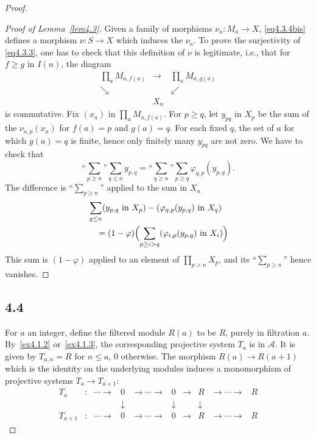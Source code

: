 \documentclass[11pt,a4paper]{article}
\theoremstyle{plain}
\theoremstyle{definition}
\numberwithin{equation}{section}
\begin{document}
\begin{proof}
\begin{proof}[Proof of Lemma~\ref{lem4.3}]
Given a family of morphisms $\nu_{a}: M_{a} \to X$, \eqref{eq4.3.4bis} defines a morphism $\nu: S \to X$ which induces the $\nu_{a}$. To prove the surjectivity of \eqref{eq4.3.3}, one has to check that this definition of $\nu$ is legitimate, i.e., that for $f \geq g$ in $I(n)$, the diagram
\begin{equation*}
\begin{array}{ccc}
\prod_{a} M_{a,f(a)} & \longrightarrow & \prod_{a} M_{a,g(a)} \\[4pt]
\searrow & & \swarrow \\[4pt]
& X_{n}
\end{array}
\end{equation*}
is commutative. Fix $(x_{a})$ in $\prod_{a} M_{a,f(a)}$. For $p \geq q$, let $y_{pq}$ in $X_{p}$ be the sum of the $\nu_{a,p}(x_{a})$ for $f(a) = p$ and $g(a) = q$. For each fixed $q$, the set of $a$ for which $g(a) = q$ is finite, hence only finitely many $y_{pq}$ are not zero. We have to check that
\begin{equation*}
\text{``}\sum_{p\geq n}\text{''} \sum_{q\leq n} y_{p,q} = \text{``}\sum_{q\geq n}\text{''} \sum_{p\geq q} \varphi_{q,p}(y_{p,q}).
\end{equation*}
The difference is ``$\sum_{p\geq n}$'' applied to the sum in $X_{n}$
\begin{align*}
&\sum_{q\leq n} (y_{p,q} \text{ in } X_{p}) - (\varphi_{q,p}(y_{p,q}) \text{ in } X_{q}) \\
&\quad = (1-\varphi)\Bigl(\sum_{p\geq i>q} (\varphi_{i,p}(y_{p,q}) \text{ in } X_{i})\Bigr)
\end{align*}
This sum is $(1-\varphi)$ applied to an element of $\prod_{p>n} X_{p}$, and its ``$\sum_{p\geq n}$'' hence vanishes.
\end{proof}

\subsection*{4.4}

For $a$ an integer, define the filtered module $R(a)$ to be $R$, purely in filtration $a$. By~\ref{ex4.1.2} or~\ref{ex4.1.3}, the corresponding projective system $T_{a}$ is in $\mathcal{A}$. It is given by $T_{a,n} = R$ for $n \leq a$, $0$ otherwise. The morphism $R(a) \to R(a+1)$ which is the identity on the underlying modules induces a monomorphism of projective systems $T_{a} \to T_{a+1}$:
\begin{equation*}
\begin{array}{cccccccccc}
T_{a} & : & \cdots \to & 0 & \to \cdots \to & 0 & \to & R & \to \cdots \to & R \\[4pt]
& & & \downarrow & & \downarrow & & \downarrow \\[4pt]
T_{a+1} & : & \cdots \to & 0 & \to \cdots \to & 0 & \to & R & \to \cdots \to & R
\end{array}
\end{equation*}


\end{proof}
\end{document}
